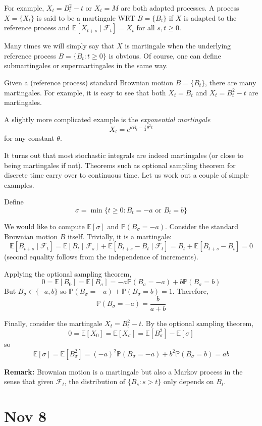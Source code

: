 \documentclass[12pt]{report}
\newcommand{\F}{\mathcal{F}}
\renewcommand{\P}{\mathbb{P}}
\newcommand{\E}{\mathbb{E}}
\newcommand*{\tbf}[1]{\ifmmode\mathbf{#1}\else\textbf{#1}\fi}
\begin{document}
    For example, $X_t = B_t^2 - t$ or $X_t = M$ are both adapted processes. A process $X = \{X_t\}$ is said to be a martingale WRT $B = \{B_t\}$ if $X$ is adapted to the reference process and $\E[X_{t+s} \; | \; \F_t] = X_t$ for all $s, t \geq 0$. 

    Many times we will simply say that $X$ is martingale when the underlying reference process $B = \{B_t: t \geq 0\}$ is obvious. Of course, one can define submartingales or supermartingales in the same way.

    Given a (reference process) standard Brownian motion $B= \{B_t\}$, there are many martingales. For example, it is easy to see that both $X_t = B_t$ and $X_t = B_t^2 - t$ are martingales.

    A slightly more complicated example is the \emph{exponential martingale} 
    \[X_t = e^{\theta B_t - \frac{1}{2} \theta^2 t}\]
    for any constant $\theta$. 

    It turns out that most stochastic integrals are indeed martingales (or close to being martingales if not). Theorems such as optional sampling theorem for discrete time carry over to continuous time. Let us work out a couple of simple examples.

    Define
    \[\sigma =  \min \{t \geq 0: B_t = -a \text{ or } B_t = b\}\]

    We would like to compute $\E[\sigma]$ and $\P(B_{\sigma} = -a)$. Consider the standard Brownian motion $B$ itself. Trivially, it is a martingale:
    \[\E[B_{t + s} \; | \; \F_t] = \E[B_t \; | \; \F_s] + \E[B_{t+s}  - B_t \; | \; \F_t] = B_t + \E[B_{t+s} - B_t] = 0\]
    (second equality follows from the independence of increments).

    Applying the optional sampling theorem,
    \[0 = \E[B_0] = \E[B_{\sigma}] = -a \P(B_{\sigma} = -a) + b \P(B_{\sigma} = b)\]
    But $B_{\sigma} \in \{-a, b\}$ so $\P(B_{\sigma} = -a) + \P(B_{\sigma} = b) = 1$. Therefore, 
    \[\P(B_{\sigma} = -a) = \frac{b}{a + b}\]

    Finally, consider the martingale $X_t = B_t^2 - t$. By the optional sampling theorem,
    \[0 = \E[X_0] = \E[X_{\sigma}] = \E[B_{\sigma}^2] - \E[\sigma]\]
    so 
    \[\E[\sigma] = \E[B_{\sigma}^2] = (-a)^2 \P(B_{\sigma} = -a) + b^2 \P(B_{\sigma} = b) = ab\]

    \tbf{Remark:} Brownian motion is a martingale but also a Markov process in the sense that given $\F_t$, the distribution of $\{B_s: s > t\}$ only depends on $B_t$. 

\section{Nov 8}
\end{document}

